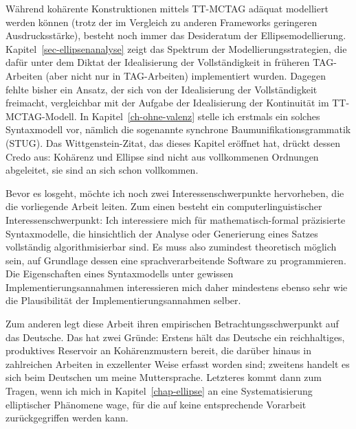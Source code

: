 Während kohärente Konstruktionen mittels TT-MCTAG adäquat modelliert werden können (trotz der im Vergleich zu anderen Frameworks geringeren Ausdrucksstärke), besteht noch immer das Desideratum der Ellipsemodellierung. Kapitel~\ref{sec-ellipsenanalyse} zeigt das Spektrum der Modellierungsstrategien, die dafür unter dem Diktat der Idealisierung der Vollständigkeit in früheren TAG-Arbeiten (aber nicht nur in TAG-Arbeiten) implementiert wurden. Dagegen fehlte bisher ein Ansatz, der sich von der Idealisierung der Vollständigkeit freimacht, vergleichbar mit der Aufgabe der Idealisierung der Kontinuität im TT-MCTAG-Modell. In Kapitel~\ref{ch-ohne-valenz} stelle ich erstmals ein solches Syntaxmodell vor, nämlich die sogenannte synchrone Baumunifikationsgrammatik (STUG). Das Wittgenstein-Zitat, das dieses Kapitel eröffnet hat, drückt dessen Credo aus: Kohärenz und Ellipse sind nicht aus vollkommenen Ordnungen abgeleitet, sie sind an sich schon vollkommen. %

Bevor es losgeht, möchte ich noch zwei Interessenschwerpunkte hervorheben, die die vorliegende Arbeit leiten. Zum einen besteht ein computerlinguistischer Interessenschwerpunkt: Ich interessiere mich für mathematisch-formal präzisierte Syntaxmodelle, die hinsichtlich der Analyse oder Generierung eines Satzes vollständig algorithmisierbar sind. Es muss also zumindest theoretisch möglich sein, auf Grundlage dessen eine sprachverarbeitende Software zu programmieren. Die Eigenschaften eines Syntaxmodells unter gewissen Implementierungsannahmen interessieren mich daher mindestens ebenso sehr wie die Plausibilität der Implementierungsannahmen selber.    

Zum anderen legt diese Arbeit ihren empirischen Betrachtungsschwerpunkt auf das Deutsche. Das hat zwei Gründe: Erstens hält das Deutsche ein reichhaltiges, produktives Reservoir an Kohärenzmustern bereit, die darüber hinaus in zahlreichen Arbeiten in exzellenter Weise erfasst worden sind; zweitens handelt es sich beim Deutschen um meine Muttersprache. Letzteres kommt dann zum Tragen, wenn ich mich in Kapitel~\ref{chap-ellipse} an eine Systematisierung elliptischer Phänomene wage, für die auf keine entsprechende Vorarbeit zurückgegriffen werden kann.








